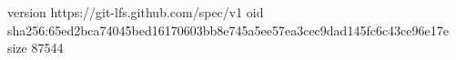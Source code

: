 version https://git-lfs.github.com/spec/v1
oid sha256:65ed2bca74045bed16170603bb8e745a5ee57ea3cec9dad145fc6c43ce96e17e
size 87544

